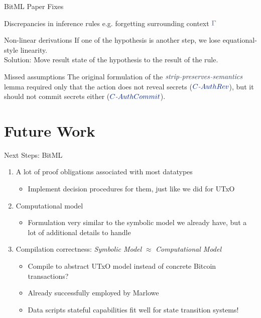 \documentclass[aspectratio=43]{beamer}
\renewcommand\alert[1]{\textcolor{mLightBrown}{#1}}
\newcommand\mathcolor[2]{\color{#1}#2}
\newcommand{\HSSym}[1]{\mathcolor{hsblue4}{\ensuremath{#1}}}
\newcommand{\HSCon}[1]{\mathcolor{hsblue3}{#1}}
\newcommand{\HSVar}[1]{\mathcolor{hsblue5}{\mathit{\ensuremath{#1}}}}
\begin{document}
\begin{frame}{BitML Paper Fixes}

\begin{alertblock}{Discrepancies in inference rules}
e.g. forgetting surrounding context \ensuremath{\HSSym{\Gamma}}
\end{alertblock}
\vfill
\begin{alertblock}{Non-linear derivations}
If one of the hypothesis is another step, we lose equational-style linearity. \\
\alert{Solution:} Move result state of the hypothesis to the result of the rule.
\end{alertblock}
\vfill
\begin{alertblock}{Missed assumptions}
The original formulation of the \ensuremath{\HSVar{strip}\HSSym{\text{\textit{-}}}\HSVar{preserves}\HSSym{\text{\textit{-}}}\HSVar{semantics}} lemma required only that the action does not reveal secrets (\ensuremath{\HSCon{C}\HSSym{\text{\textit{-}}}\HSCon{AuthRev}}), but it should not commit secrets either (\ensuremath{\HSCon{C}\HSSym{\text{\textit{-}}}\HSCon{AuthCommit}}).
\end{alertblock}

\end{frame}
\section{Future Work}

\begin{frame}{Next Steps: BitML}
\begin{enumerate}
\item A lot of proof obligations associated with most datatypes
  \begin{itemize}
  \item Implement \alert{decision procedures} for them, just like we did for UTxO
  \end{itemize}
\item Computational model
  \begin{itemize}
  \item Formulation very similar to the symbolic model we already have,
     but a lot of additional details to handle
  \end{itemize}
\item Compilation correctness: \textit{Symbolic Model} $\approx$ \textit{Computational Model}
  \begin{itemize}
  \item Compile to \alert{abstract UTxO model} instead of concrete Bitcoin transactions?
  \item Already successfully employed by \alert{Marlowe}
  \item \alert{Data scripts} stateful capabilities fit well for state transition systems!
  \end{itemize}
\end{enumerate}
\end{frame}
\end{document}
